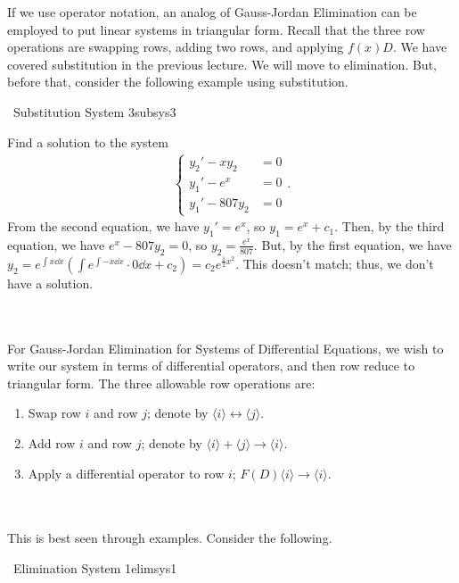     If we use operator notation, an analog of Gauss-Jordan Elimination can be employed to put linear systems in triangular form. Recall that the three row operations are swapping rows, adding two rows, and applying \(f(x)D\). We have covered substitution in the previous lecture. We will move to elimination. But, before that, consider the following example using substitution.
    \begin{example}{\Difficulty\,\Difficulty\,\,Substitution System 3}{subsys3}

        Find a solution to the system
        \begin{align*}
            \begin{cases}
                y_2'-xy_2&=0 \\
                y_1'-e^x&=0 \\
                y_1'-807y_2&=0
            \end{cases}.
        \end{align*}
        From the second equation, we have \(y_1'=e^x\), so \(y_1=e^x+c_1\). Then, by the third equation, we have \(e^x-807y_2=0\), so \(y_2=\frac{e^x}{807}\). But, by the first equation, we have \(y_2=e^{\int x \dd x}\left(\int e^{\int -x\dd x}\cdot 0\dd x+c_2\right)=c_2e^{\frac{1}{2}x^2}\). This doesn't match; thus, we don't have a solution.
    \end{example}
    \vphantom
    \\
    \\
    For Gauss-Jordan Elimination for Systems of Differential Equations, we wish to write our system in terms of differential operators, and then row reduce to triangular form. The three allowable row operations are:
    \begin{enumerate}
        \item Swap row \(i\) and row \(j\); denote by \(\langle i\rangle\leftrightarrow\langle j\rangle\).
        \item Add row \(i\) and row \(j\); denote by \(\langle i\rangle+\langle j\rangle\to\langle i \rangle\).
        \item Apply a differential operator to row \(i\); \(F(D)\langle i\rangle\to\langle i \rangle\).
    \end{enumerate} 
    \pagebreak
    \vphantom
    \\
    \\
    This is best seen through examples. Consider the following.
    \begin{example}{\Difficulty\,\Difficulty\,\,Elimination System 1}{elimsys1}

            
    \end{example}

